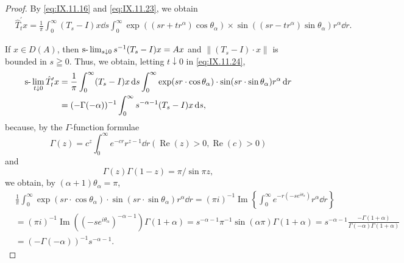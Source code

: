 \begin{proof}
 By \eqref{eq:IX.11.16} and \eqref{eq:IX.11.23}, we obtain 
\begin{equation}\label{eq:IX.11.24}
\begin{aligned}
&\hat {T} _{t} ^{\prime} x = \frac {1}{\pi} \int_{0} ^{\infty} (T _{s} - I) x \dd s \int_{0} ^{\infty} \exp ((s r + t r ^{\alpha}) \cos \theta_{\alpha}) \times \sin ((s r - t r ^{\alpha}) \sin \theta_{\alpha}) r ^{\alpha} \dd r.
\end{aligned}
\end{equation}

If $x \in D(A)$, then $\text{s-}\lim\nolimits_{s \downarrow 0} s^{-1}(T_s - I)x = Ax$ and $\|(T_s - I) \cdot x\|$ is bounded in $s \geqq 0$. Thus, we obtain, letting $t \downarrow 0$ in \eqref{eq:IX.11.24}, 
\[
\begin{aligned} \text{s-}\lim _{t \downarrow 0} \hat {T} _{t} ^{\prime} x & = \frac {1}{\pi} \int_{0} ^{\infty} (T _{s} - I) x \mathop{}\!\mathrm{d} s \int_{0} ^{\infty} \exp (s r \cdot \cos \theta_{\alpha}) \cdot \sin (s r \cdot \sin \theta_{\alpha}) r ^{\alpha} \mathop{}\!\mathrm{d} r \\ & = (- \Gamma (- \alpha)) ^{-1} \int_{0} ^{\infty} s ^{- \alpha -1} (T _{s} - I) x \mathop{}\!\mathrm{d} s, \end{aligned}
\]
because, by the $\Gamma$-function formulae 
\begin{equation}\label{eq:IX.11.25}
\Gamma (z) = c ^{z} \int_{0} ^{\infty} e ^{-cr} r ^{z-1} \dd r \left(\operatorname{Re} (z) > 0, \operatorname{Re} (c) > 0\right)
\end{equation}
and 
\begin{equation}\label{eq:IX.11.26}
\Gamma (z) \Gamma (1 - z) = \pi / \sin \pi z,
\end{equation}
we obtain, by $(\alpha + 1)\theta_{\alpha} = \pi$, 
\[
\begin{aligned}
&\frac {1}{\pi} \int_{0} ^{\infty} \exp (s r \cdot \cos \theta_{\alpha}) \cdot \sin (s r \cdot \sin \theta_{\alpha}) r ^{\alpha} \dd r = (\pi i) ^{-1} \operatorname{Im} \left\{\int_{0} ^{\infty} e ^ {- r (- s e ^ {i \theta_{\alpha}})} r ^{\alpha} \dd r \right\}
\\
&= (\pi i) ^{-1} \operatorname{Im} ((- s e ^ {i \theta_{\alpha}}) ^{- \alpha -1}) \Gamma (1 + \alpha) = s ^{- \alpha -1} \pi^{-1} \sin (\alpha \pi) \Gamma (1 + \alpha) = s ^{- \alpha -1} \frac {- \Gamma (1 + \alpha)}{\Gamma (- \alpha) \Gamma (1 + \alpha)}
\\
&= (- \Gamma (- \alpha)) ^{-1} s ^{- \alpha -1} .
\end{aligned}
\]


\end{proof}
